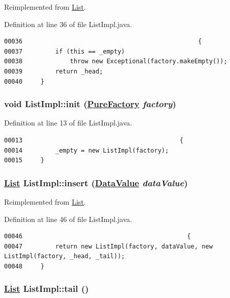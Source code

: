 Reimplemented from \hyperlink{interfaceList_a0}{List}.

Definition at line 36 of file List\-Impl.java.\footnotesize\begin{verbatim}00036                                                {
00037         if (this == _empty)
00038             throw new Exceptional(factory.makeEmpty());
00039         return _head;
00040     }
\end{verbatim}\normalsize 
\hypertarget{classListImpl_f0}{
\subsubsection[init]{\setlength{\rightskip}{0pt plus 5cm}void List\-Impl::init (\hyperlink{classPureFactory}{Pure\-Factory} {\em factory})}}
\label{classListImpl_f0}




Definition at line 13 of file List\-Impl.java.\footnotesize\begin{verbatim}00013                                           {
00014         _empty = new ListImpl(factory);
00015     }
\end{verbatim}\normalsize 
\hypertarget{classListImpl_a2}{
\subsubsection[insert]{\setlength{\rightskip}{0pt plus 5cm}\hyperlink{interfaceList}{List} List\-Impl::insert (\hyperlink{interfaceDataValue}{Data\-Value} {\em data\-Value})}}
\label{classListImpl_a2}




Reimplemented from \hyperlink{interfaceList_a2}{List}.

Definition at line 46 of file List\-Impl.java.\footnotesize\begin{verbatim}00046                                             {
00047         return new ListImpl(factory, dataValue, new ListImpl(factory, _head, _tail));
00048     }
\end{verbatim}\normalsize 
\hypertarget{classListImpl_a1}{
\subsubsection[tail]{\setlength{\rightskip}{0pt plus 5cm}\hyperlink{interfaceList}{List} List\-Impl::tail ()}}
\label{classListImpl_a1}




